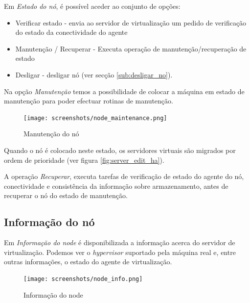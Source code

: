 Em \emph{Estado do nó}, é possível aceder ao conjunto de opções:
\begin{itemize}
    \item Verificar estado - envia ao servidor de virtualização um pedido de verificação do estado da conectividade do agente
    \item Manutenção / Recuperar - Executa operação de manutenção/recuperação de estado 
    \item Desligar - desligar nó (ver secção \ref{sub:desligar_no}).
\end{itemize}

Na opção \emph{Manutenção} temos a possibilidade de colocar a máquina em estado de manutenção para poder efectuar rotinas de manutenção.
\begin{figure}[H]
	\begin{center}
	\texttt{[image: screenshots/node\_maintenance.png]}
	\caption{Manutenção do nó}
	\label{fig:node_maintenance}
	\end{center}
\end{figure}

Quando o nó é colocado neste estado, os servidores virtuais são migrados por ordem de prioridade (ver figura \ref{fig:server_edit_ha}).

A operação \emph{Recuperar}, executa tarefas de verificação de estado do agente do nó, conectividade e consistência da informação sobre armazenamento, antes de recuperar o nó do estado de manutenção.

\subsection{Informação do nó}
\label{sec:nodeinfo}
Em \emph{Informação do node} é disponibilizada a informação acerca do servidor de virtualização. Podemos ver o \emph{hypervisor} suportado pela máquina real e, entre outras informações, o estado do agente de virtualização.

\begin{figure}[H]
	\begin{center}
	\texttt{[image: screenshots/node\_info.png]}
	\caption{Informação do node}
	\label{fig:node_info}
	\end{center}
\end{figure}

